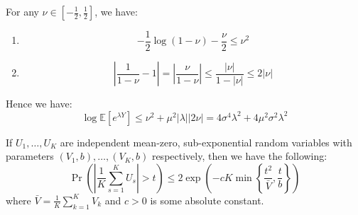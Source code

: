 For any $\nu\in[-\tfrac{1}{2}, \tfrac{1}{2}]$, we have:

\begin{enumerate}
    \item 
    \[
    -\frac{1}{2} \log(1 - \nu) - \frac{\nu}{2} \leq \nu^2
    \]

    \item 
    \[
    \left| \frac{1}{1 - \nu} - 1 \right| 
    = \left| \frac{\nu}{1 - \nu} \right| 
    \leq \frac{|\nu|}{1 - |\nu|} 
    \leq 2|\nu|
    \]
\end{enumerate}

Hence we have:
\[
\log \mathbb{E}[e^{\lambda Y}] 
\leq \nu^2 + \mu^2 |\lambda| |2\nu| 
= 4\sigma^4 \lambda^2 + 4\mu^2 \sigma^2 \lambda^2
\]

\begin{lemma}\label{lem:sub-exp-additive}
If $U_1, \ldots, U_K$ are independent mean-zero, sub-exponential random variables with parameters $(V_1, b),\ldots,(V_K,b)$ respectively, then we have the following:
\[
 \Pr\left( \left| \frac{1}{K} \sum_{s=1}^{K} U_s \right| > t \right) 
\leq 2 \exp\left( -cK \min\left\{ \frac{t^2}{\bar{V}}, \frac{t}{b} \right\} \right)
\]
where $\bar{V} = \frac{1}{K} \sum_{k=1}^{K} V_k$ and $c>0$ is some absolute constant.
\end{lemma}
